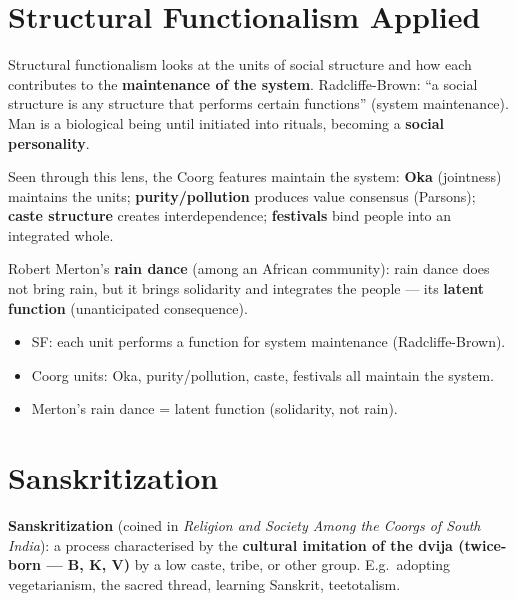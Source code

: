 \section{Structural Functionalism Applied}

\begin{KeyConcept}
Structural functionalism looks at the units of social structure and how each contributes to the \textbf{maintenance of the system}. Radcliffe-Brown: ``a social structure is any structure that performs certain functions'' (system maintenance). Man is a biological being until initiated into rituals, becoming a \textbf{social personality}.
\end{KeyConcept}

Seen through this lens, the Coorg features maintain the system: \textbf{Oka} (jointness) maintains the units; \textbf{purity/pollution} produces value consensus (Parsons); \textbf{caste structure} creates interdependence; \textbf{festivals} bind people into an integrated whole.

\begin{ExampleBox}
Robert Merton's \textbf{rain dance} (among an African community): rain dance does not bring rain, but it brings solidarity and integrates the people --- its \textbf{latent function} (unanticipated consequence).
\end{ExampleBox}

\begin{QuickRevision}
\begin{itemize}
\item SF: each unit performs a function for system maintenance (Radcliffe-Brown).
\item Coorg units: Oka, purity/pollution, caste, festivals all maintain the system.
\item Merton's rain dance = latent function (solidarity, not rain).
\end{itemize}
\end{QuickRevision}

\section{Sanskritization}

\begin{KeyConcept}
\textbf{Sanskritization} (coined in \emph{Religion and Society Among the Coorgs of South India}): a process characterised by the \textbf{cultural imitation of the dvija (twice-born --- B, K, V)} by a low caste, tribe, or other group. E.g.\ adopting vegetarianism, the sacred thread, learning Sanskrit, teetotalism.
\end{KeyConcept}

